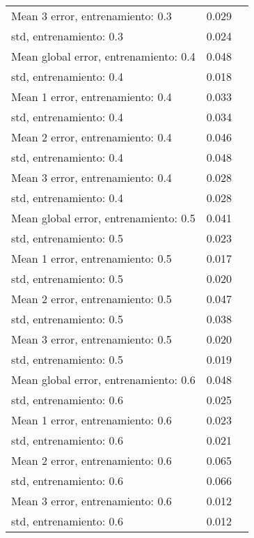 \begin{longtable}{p{4cm}|p{1.5cm}|p{1.5cm}}
Mean 3 error, entrenamiento: 0.3      &              0.029 \\
std, entrenamiento: 0.3               &              0.024 \\
Mean global error, entrenamiento: 0.4 &              0.048 \\
std, entrenamiento: 0.4               &              0.018 \\
Mean 1 error, entrenamiento: 0.4      &              0.033 \\
std, entrenamiento: 0.4               &              0.034 \\
Mean 2 error, entrenamiento: 0.4      &              0.046 \\
std, entrenamiento: 0.4               &              0.048 \\
Mean 3 error, entrenamiento: 0.4      &              0.028 \\
std, entrenamiento: 0.4               &              0.028 \\
Mean global error, entrenamiento: 0.5 &              0.041 \\
std, entrenamiento: 0.5               &              0.023 \\
Mean 1 error, entrenamiento: 0.5      &              0.017 \\
std, entrenamiento: 0.5               &              0.020 \\
Mean 2 error, entrenamiento: 0.5      &              0.047 \\
std, entrenamiento: 0.5               &              0.038 \\
Mean 3 error, entrenamiento: 0.5      &              0.020 \\
std, entrenamiento: 0.5               &              0.019 \\
Mean global error, entrenamiento: 0.6 &              0.048 \\
std, entrenamiento: 0.6               &              0.025 \\
Mean 1 error, entrenamiento: 0.6      &              0.023 \\
std, entrenamiento: 0.6               &              0.021 \\
Mean 2 error, entrenamiento: 0.6      &              0.065 \\
std, entrenamiento: 0.6               &              0.066 \\
Mean 3 error, entrenamiento: 0.6      &              0.012 \\
std, entrenamiento: 0.6               &              0.012 \\

\end{longtable}
